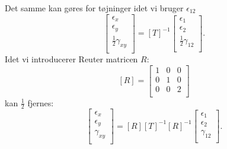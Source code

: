 Det samme kan gøres for tøjninger idet vi bruger $\epsilon_{12}$
\begin{equation*}
  \begin{bmatrix}
    \epsilon_x\\
  \epsilon_y\\
  \frac{1}{2}\gamma_{xy}\\
  \end{bmatrix} = \left[ T \right]^{-1} \begin{bmatrix}
    \epsilon_1\\
  \epsilon_2\\
  \frac{1}{2}\gamma_{12}\\
  \end{bmatrix}
.\end{equation*}
Idet vi introducerer Reuter matricen $R$:
\begin{equation*}
  \left[ R \right] = \begin{bmatrix}
    1 & 0 & 0\\
  0 & 1 & 0\\
  0 & 0 & 2\\
  \end{bmatrix}
\end{equation*}
kan $\frac{1}{2}$ fjernes:
\begin{equation*}
  \begin{bmatrix}
    \epsilon_x\\
  \epsilon_y\\
  \gamma_{xy}\\
  \end{bmatrix} = \left[ R \right]\left[ T \right]^{-1} \left[ R \right]^{-1} \begin{bmatrix}
    \epsilon_1\\
  \epsilon_2\\
  \gamma_{12}\\
  \end{bmatrix}
.\end{equation*}


